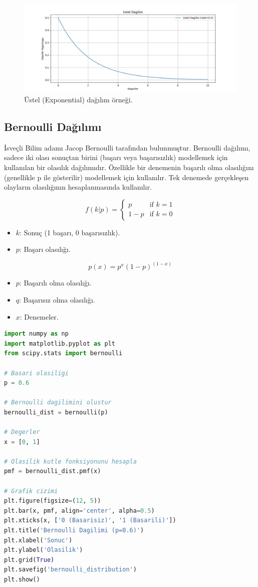\begin{figure}[h]
    \centering
    \includegraphics[width=1\textwidth]{images/exponential_distribution.png}
    \caption{Üstel (Exponential) dağılım örneği.}
    \label{fig:enter-label}
\end{figure}

\subsection{Bernoulli Dağılımı}
İsveçli Bilim adamı Jacop Bernoulli tarafından bulunmuştur. Bernoulli dağılımı, sadece iki olası sonuçtan birini (başarı veya başarısızlık) modellemek için kullanılan bir olasılık dağılımıdır. Özellikle bir denemenin başarılı olma olasılığını (genellikle p ile gösterilir) modellemek için kullanılır. Tek denemede gerçekleşen olayların olasılığının hesaplanmasında kullanılır.

\[f(k|p) = \begin{cases} p & \text{if } k = 1 \\ 1 - p & \text{if } k = 0 \end{cases}\]
\begin{itemize}
	\item $k$: Sonuç (1 başarı, 0 başarısızlık).
	\item $p$: Başarı olasılığı.
\end{itemize}

\[
p(x) = p^x (1 - p)^(1- x)
\]

\begin{itemize}
	\item $p$: Başarılı olma olasılığı.
	\item $q$: Başarısız olma olasılığı.
	\item $x$: Denemeler.
\end{itemize}

\begin{lstlisting}[language=Python]
import numpy as np
import matplotlib.pyplot as plt
from scipy.stats import bernoulli

# Basari olasiligi
p = 0.6

# Bernoulli dagilimini olustur
bernoulli_dist = bernoulli(p)

# Degerler
x = [0, 1]

# Olasilik kutle fonksiyonunu hesapla
pmf = bernoulli_dist.pmf(x)

# Grafik cizimi
plt.figure(figsize=(12, 5))
plt.bar(x, pmf, align='center', alpha=0.5)
plt.xticks(x, ['0 (Basarisiz)', '1 (Basarili)'])
plt.title('Bernoulli Dagilimi (p=0.6)')
plt.xlabel('Sonuc')
plt.ylabel('Olasilik')
plt.grid(True)
plt.savefig('bernoulli_distribution')
plt.show()
\end{lstlisting}

